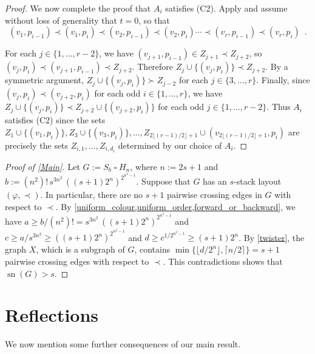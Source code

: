 \documentclass[kpfonts]{patmorin}
\DeclareMathOperator{\sn}{sn}
\renewcommand{\ge}{\geqslant}
\renewcommand{\geq}{\geqslant}
\newcommand{\CartProd}{\mathbin{\square}}
\begin{document}
\begin{proof}

We now complete the proof that $A_i$ satisfies (C2). Apply  and assume without loss of generality that $t=0$, so that
	\[
		(v_1,p_{i-1})\prec (v_1,p_{i}) \prec (v_2,p_{i-1}) \prec (v_2,p_{i}) \cdots \prec (v_r,p_{i-1}) \prec (v_r,p_{i}) \enspace .
	\]

    For each $j\in\{1,\ldots,r-2\}$, we have $(v_{j+1},p_{i-1})\in Z_{j+1}\prec Z_{j+2}$, so  $(v_j,p_i)\prec (v_{j+1},p_{i-1}) \prec Z_{j+2}$.  Therefore $Z_j\cup\{(v_j,p_i)\} \prec Z_{j+2}$.  By a symmetric argument, $Z_j\cup\{(v_j,p_i)\} \succ Z_{j-2}$ for each  $j\in\{3,\ldots,r\}$.  Finally, since $(v_{j},p_i)\prec (v_{j+2},p_i)$ for each odd $i\in\{1,\ldots,r\}$, we have $Z_{j}\cup\{(v_j,p_i)\} \prec Z_{j+2}\cup\{(v_{j+2},p_i)\}$ for each odd $j\in\{1,\ldots,r-2\}$.  Thus $A_i$ satisfies (C2) since the sets $Z_1\cup\{(v_1,p_i)\},Z_3\cup\{(v_3,p_i)\},\ldots,Z_{2\lfloor (r-1)/2\rfloor+1} \cup (v_{2\lfloor (r-1)/2\rfloor+1},p_i)$ are precisely the sets $Z_{i,1},\ldots,Z_{i,d_i}$ determined by our choice of $A_i$.
\end{proof}


\begin{proof}[Proof of \cref{Main}]
Let $G := S_b \CartProd H_n$, where $n :=2s+1$ and $b := (n^2)!\, s^{3n^2}\, ((s+1)2^n)^{2^{n^2-1}} $. Suppose that $G$ has an $s$-stack layout  $(\varphi,\prec)$. In particular, there are no $s+1$ pairwise crossing edges in $G$ with respect to $\prec$. By \cref{uniform_colour,uniform_order,forward_or_backward}, we have $a\ge b/(n^2)! = s^{3n^2}\, ((s+1)2^n)^{2^{n^2-1}}$ and $c\ge a/s^{3n^2} \geq ((s+1)2^n)^{2^{n^2-1}}$ and
$d\ge c^{1/2^{n^2-1}} \ge (s+1)2^n$. By \cref{twister}, the graph $X$, which is a subgraph of $G$, contains $\min\{\lfloor d/2^{n}\rfloor,\lceil n/2\rceil\}=s+1$ pairwise crossing edges with respect to $\prec$. This contradictions shows that $\sn(G)> s$.
\end{proof}

\section{Reflections}

We now mention some further consequences of our main result. 
\end{document}
